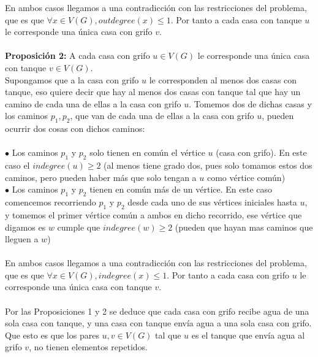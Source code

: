 \documentclass{article}
\begin{document}
    En ambos casos llegamos a una contradicci\'on con las restricciones del problema, que es que $\forall x \in V(G), outdegree(x) \leq 1$. 
    Por tanto a cada casa con tanque $u$ le corresponde una \'unica casa con grifo $v$.\\\\

    \noindent \textbf{Proposici\'on 2:} A cada casa con grifo $u \in V(G)$ le corresponde una \'unica casa con tanque $v \in V(G)$.\\

    Supongamos que a la casa con grifo $u$ le corresponden al menos dos casas con tanque, eso quiere decir que hay al menos dos casas
    con tanque tal que hay un camino de cada una de ellas a la casa con grifo $u$. Tomemos dos de dichas casas y los caminos $p_1, p_2$,
     que van de cada una de ellas a la casa con grifo $u$, pueden ocurrir dos cosas con dichos caminos:\\\\

    $\bullet$ Los caminos $p_1$ y $p_2$ solo tienen en com\'un el v\'ertice $u$ (casa con grifo). En este caso
    el $indegree(u) \geq 2$ (al menos tiene grado dos, pues solo tomamos estos dos caminos, pero pueden haber m\'as que
    solo tengan a $u$ como v\'ertice com\'un)\\
 
    $\bullet$ Los caminos $p_1$ y $p_2$ tienen en com\'un m\'as de un v\'ertice. En este caso comencemos recorriendo $p_1$ y $p_2$ desde cada
    uno de sus v\'ertices iniciales hasta $u$, y tomemos el primer v\'ertice com\'un a ambos en dicho recorrido, ese v\'ertice que digamos es $w$
    cumple que $indegree(w) \geq 2$ (pueden que hayan mas caminos que lleguen a $w$)\\\\

    En ambos casos llegamos a una contradicci\'on con las restricciones del problema, que es que $\forall x \in V(G), indegree(x) \leq 1$. 
    Por tanto a cada casa con grifo $u$ le corresponde una \'unica casa con tanque $v$.\\\\

    Por las Proposiciones 1 y 2 se deduce que cada casa con grifo recibe agua de una sola casa con tanque, y una casa con tanque env\'ia agua a
    una sola casa con grifo. Que esto es que los pares $u,v \in V(G)$ tal que $u$ es el tanque que env\'ia agua al grifo $v$, no tienen elementos repetidos.\\\\\
\end{document}

